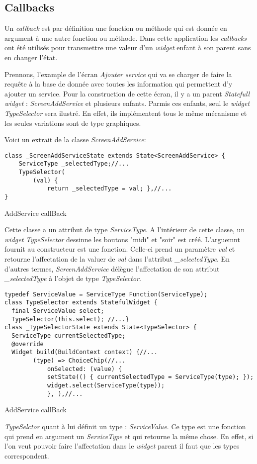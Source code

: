 \subsection*{Callbacks}
Un \textit{callback} est par définition une fonction ou méthode qui est donnée en argument à une autre fonction ou méthode. 
Dans cette application les \textit{callbacks} ont été utilisés pour transmettre une valeur d'un \textit{widget} enfant à son parent sans en changer l'état. 

Prennons, l'example de l'écran \textit{Ajouter service} qui va se charger de faire la requête à la base de donnée avec toutes les information qui permettent d'y ajouter un service. Pour la construction de cette écran, il y a un parent \textit{Statefull widget} : \textit{ScreenAddService} et plusieurs enfants. Parmis ces enfants, seul le \textit{widget} \textit{TypeSelector} sera ilustré. En effet, ils implémentent tous le même mécanisme et les seules variations sont de type graphiques.

Voici un extrait de la classe \textit{ScreenAddService}:
\begin{listing}[!h]
\begin{verbatim}
class _ScreenAddServiceState extends State<ScreenAddService> {
    ServiceType _selectedType;//...
    TypeSelector(
        (val) {
            return _selectedType = val; },//...
}
\end{verbatim}
\caption{AddService callBack}
\label{code:addServiceCallback}
\end{listing}

Cette classe a un attribut de type \textit{ServiceType}. A l'intérieur de cette classe, un \textit{widget} \textit{TypeSelector} dessinne les boutons "midi" et "soir" est créé. L'arguemnt fournit au constructeur est une fonction. Celle-ci prend un paramètre \textit{val} et retourne l'affectation de la valuer de \textit{val} dans l'attribut \textit{\_selectedType}. En d'autres termes, \textit{ScreenAddService} délègue l'affectation de son attribut \textit{\_selectedType} à l'objet de type \textit{TypeSelector}. 

\begin{listing}[!h]
\begin{verbatim}
typedef ServiceValue = ServiceType Function(ServiceType);
class TypeSelector extends StatefulWidget {
  final ServiceValue select;
  TypeSelector(this.select); //...}
class _TypeSelectorState extends State<TypeSelector> {
  ServiceType currentSelectedType;
  @override
  Widget build(BuildContext context) {//...
        (type) => ChoiceChip(//...
            onSelected: (value) {
            setState(() { currentSelectedType = ServiceType(type); });
            widget.select(ServiceType(type));
            }, ),//...
\end{verbatim}
\caption{AddService callBack}
\label{code:TypeSelectorCallback}
\end{listing}
\textit{TypeSelctor} quant à lui définit un type : \textit{ServiceValue}. Ce type est une fonction qui prend en argument un \textit{ServiceType} et qui retourne la même chose. En effet, si l'on veut pouvoir faire l'affectation dans le \textit{widget} parent il faut que les types correspondent.

